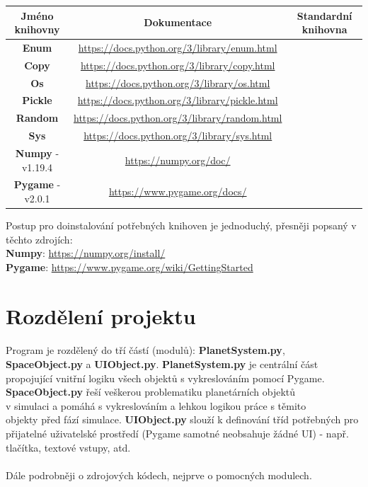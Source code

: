 \documentclass[a4paper, 12pt]{article}
\newcommand{\cmark}{\ding{51}}
\newcommand{\xmark}{\ding{55}}
\begin{document}
\begin{table}[h!]
\centering
\hspace*{-1.5cm}
\begin{tabular}{ |c|c|c| }
 \hline
 Jméno knihovny & Dokumentace & Standardní knihovna\\
 \hline
 \textbf{Enum} & \url{https://docs.python.org/3/library/enum.html} & \cmark\\
 \hline
 \textbf{Copy} & \url{https://docs.python.org/3/library/copy.html} & \cmark\\
 \hline
 \textbf{Os} & \url{https://docs.python.org/3/library/os.html} & \cmark\\
 \hline
 \textbf{Pickle} & \url{https://docs.python.org/3/library/pickle.html} & \cmark\\
 \hline
 \textbf{Random} & \url{https://docs.python.org/3/library/random.html} & \cmark\\
 \hline
 \textbf{Sys} & \url{https://docs.python.org/3/library/sys.html} & \cmark\\
 \hline
 \textbf{Numpy} - v1.19.4 & \url{https://numpy.org/doc/} & \xmark\\
 \hline
 \textbf{Pygame} - v2.0.1 & \url{https://www.pygame.org/docs/} & \xmark\\
 \hline
\end{tabular}
\end{table}
\newpage
Postup pro doinstalování potřebných knihoven je jednoduchý, přesněji popsaný v
těchto zdrojích:\\
\textbf{Numpy}: \url{https://numpy.org/install/}\\
\textbf{Pygame}: \url{https://www.pygame.org/wiki/GettingStarted}\\

\section{Rozdělení projektu}
\paragraph{}
Program je rozdělený do tří částí (modulů): \textbf{PlanetSystem.py},
\\\textbf{SpaceObject.py} a \textbf{UIObject.py}. \textbf{PlanetSystem.py} je
centrální část propojující vnitřní logiku všech objektů s vykreslováním pomocí
Pygame.  \textbf{SpaceObject.py} řeší veškerou problematiku planetárních
objektů \\v simulaci a pomáhá s vykreslováním a lehkou logikou práce s těmito
\\objekty před fází simulace.  \textbf{UIObject.py} slouží k definování tříd
potřebných pro přijatelné uživatelské prostředí (Pygame samotné neobsahuje
žádné UI) - např.  tlačítka, textové vstupy, atd.\\\\
Dále podrobněji o zdrojových kódech, nejprve o pomocných modulech.
\end{document}
